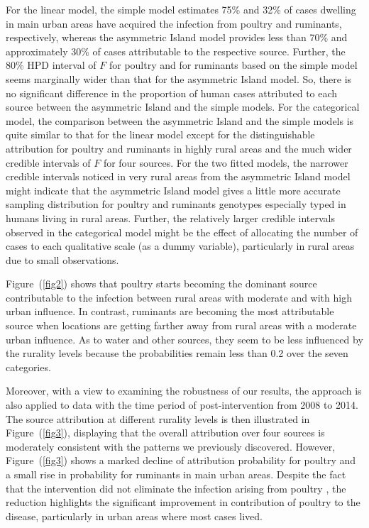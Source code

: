 \documentclass[times, doublespace]{simauth}%
\begin{document}
For the linear model, the simple model estimates 75\% and 32\% of cases dwelling in main urban areas have acquired the infection from poultry and ruminants, respectively, whereas the asymmetric Island model provides less than 70\% and approximately 30\% of cases attributable to the respective source. Further, the 80\% HPD interval of $F$ for poultry and for ruminants based on the simple model seems marginally wider than that for the asymmetric Island model. So, there is no significant difference in the proportion of human cases attributed to each source between the asymmetric Island and the simple models. For the categorical model, the comparison between the asymmetric Island and the simple models is quite similar to that for the linear model except for the distinguishable attribution for poultry and ruminants in highly rural areas and the much wider credible intervals of $F$ for four sources. For the two fitted models, the narrower credible intervals noticed in very rural areas from the asymmetric Island model might indicate that the asymmetric Island model gives a little more accurate sampling distribution for poultry and ruminants genotypes especially typed in humans living in rural areas. Further, the relatively larger credible intervals observed in the categorical model might be the effect of allocating the number of cases to each qualitative scale (as a dummy variable), particularly in rural areas due to small observations.

Figure~(\ref{fig2}) shows that poultry starts becoming the dominant source contributable to the infection between rural areas with moderate and with high urban influence. In contrast, ruminants are becoming the most attributable source when locations are getting farther away from rural areas with a moderate urban influence. As to water and other sources, they seem to be less influenced by the rurality levels because the probabilities remain less than 0.2 over the seven categories.

Moreover, with a view to examining the robustness of our results, the approach is also applied to data with the time period of post-intervention from 2008 to 2014. The source attribution at different rurality levels is then illustrated in Figure~(\ref{fig3}), displaying that the overall attribution over four sources is moderately consistent with the patterns we previously discovered. However, Figure~(\ref{fig3}) shows a marked decline of attribution probability for poultry and a small rise in probability for ruminants in main urban areas. Despite the fact that the intervention did not eliminate the infection arising from poultry \cite{MuelM}, the reduction highlights the significant improvement in contribution of poultry to the disease, particularly in urban areas where most cases lived. 
\end{document}
